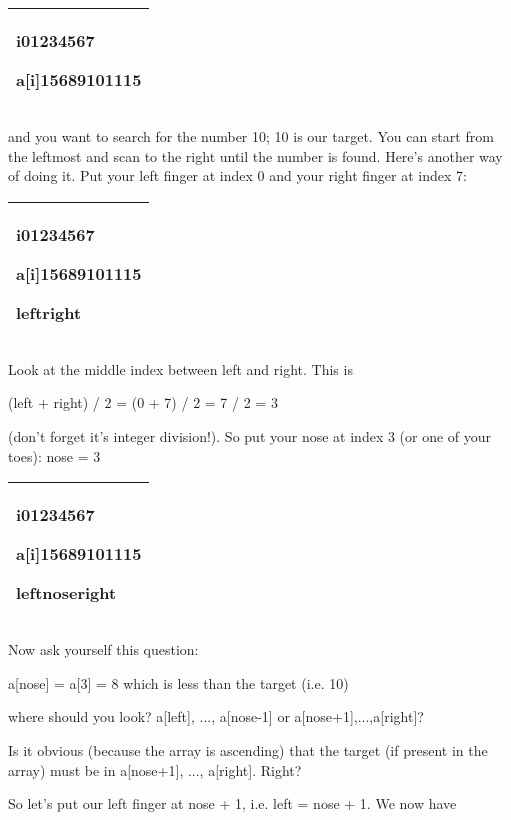 \documentclass[
]{article}
\begin{document}
\begin{longtable}[]{@{}l@{}}
\toprule
\endhead
\begin{minipage}[t]{0.97\columnwidth}\raggedright
i01234567

a{[}i{]}15689101115\strut
\end{minipage}\tabularnewline
\bottomrule
\end{longtable}

and you want to search for the number 10; 10 is our target. You can
start from the leftmost and scan to the right until the number is found.
Here's another way of doing it. Put your left finger at index 0 and your
right finger at index 7:

\begin{longtable}[]{@{}l@{}}
\toprule
\endhead
\begin{minipage}[t]{0.97\columnwidth}\raggedright
i01234567

a{[}i{]}15689101115

leftright\strut
\end{minipage}\tabularnewline
\bottomrule
\end{longtable}

Look at the middle index between left and right. This is

(left + right) / 2 = (0 + 7) / 2 = 7 / 2 = 3

(don't forget it's integer division!). So put your nose at index 3 (or
one of your toes): nose = 3

\begin{longtable}[]{@{}l@{}}
\toprule
\endhead
\begin{minipage}[t]{0.97\columnwidth}\raggedright
i01234567

a{[}i{]}15689101115

leftnoseright\strut
\end{minipage}\tabularnewline
\bottomrule
\end{longtable}

Now ask yourself this question:

a{[}nose{]} = a{[}3{]} = 8 which is less than the target (i.e. 10)

where should you look? a{[}left{]}, ..., a{[}nose-1{]} or
a{[}nose+1{]},...,a{[}right{]}?

Is it obvious (because the array is ascending) that the target (if
present in the array) must be in a{[}nose+1{]}, ..., a{[}right{]}.
Right?

So let's put our left finger at nose + 1, i.e. left = nose + 1. We now
have
\end{document}
